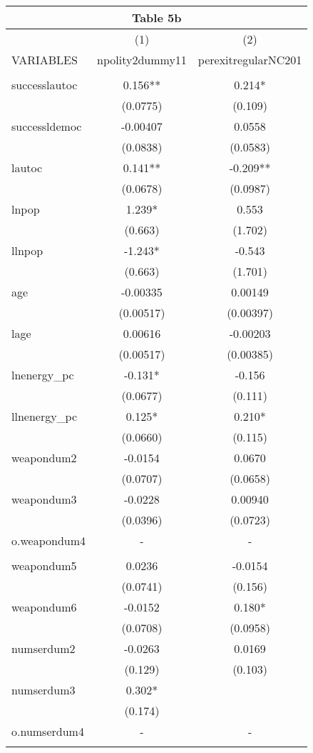 \documentclass[]{article}
\begin{document}
\begin{tabular}{lcc}
\multicolumn{3}{c}{Table 5b} \\ \hline
 & (1) & (2) \\
VARIABLES & npolity2dummy11 & perexitregularNC201 \\ \hline
 &  &  \\
successlautoc & 0.156** & 0.214* \\
 & (0.0775) & (0.109) \\
successldemoc & -0.00407 & 0.0558 \\
 & (0.0838) & (0.0583) \\
lautoc & 0.141** & -0.209** \\
 & (0.0678) & (0.0987) \\
lnpop & 1.239* & 0.553 \\
 & (0.663) & (1.702) \\
llnpop & -1.243* & -0.543 \\
 & (0.663) & (1.701) \\
age & -0.00335 & 0.00149 \\
 & (0.00517) & (0.00397) \\
lage & 0.00616 & -0.00203 \\
 & (0.00517) & (0.00385) \\
lnenergy\_pc & -0.131* & -0.156 \\
 & (0.0677) & (0.111) \\
llnenergy\_pc & 0.125* & 0.210* \\
 & (0.0660) & (0.115) \\
weapondum2 & -0.0154 & 0.0670 \\
 & (0.0707) & (0.0658) \\
weapondum3 & -0.0228 & 0.00940 \\
 & (0.0396) & (0.0723) \\
o.weapondum4 & - & - \\
 &  &  \\
weapondum5 & 0.0236 & -0.0154 \\
 & (0.0741) & (0.156) \\
weapondum6 & -0.0152 & 0.180* \\
 & (0.0708) & (0.0958) \\
numserdum2 & -0.0263 & 0.0169 \\
 & (0.129) & (0.103) \\
numserdum3 & 0.302* &  \\
 & (0.174) &  \\
o.numserdum4 & - & - \\
 &  &  \\

\end{tabular}
\end{document}
